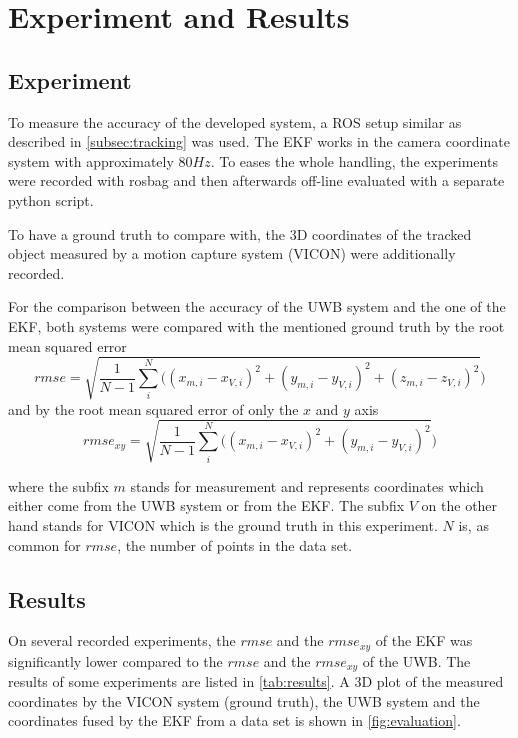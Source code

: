 

\chapter{Experiment and Results}

\section{Experiment}
To measure the accuracy of the developed system, a \ac{ROS} setup similar as described in \autoref{subsec:tracking} was used. The \acf{EKF} works in the camera coordinate system with approximately $80\mathit{Hz}$. To eases the whole handling, the experiments were recorded with rosbag and then afterwards off-line evaluated with a separate python script.

To have a ground truth to compare with, the 3D coordinates of the tracked object measured by a motion capture system (VICON) were additionally recorded.

For the comparison between the accuracy of the \ac{UWB} system and the one of the \ac{EKF}, both systems were compared with the mentioned ground truth by the root mean squared error $$\textit{rmse} = \sqrt{\frac{1}{N - 1} \sum_i^N \big( (x_{m,i} - x_{V,i})^2 + (y_{m,i} - y_{V,i})^2 + (z_{m,i} - z_{V,i})^2}\big)$$
and by the root mean squared error of only the $x$ and $y$ axis
$$\textit{rmse}_{xy} = \sqrt{\frac{1}{N - 1} \sum_i^N \big( (x_{m,i} - x_{V,i})^2 + (y_{m,i} - y_{V,i})^2}\big)$$

where the subfix $m$ stands for measurement and represents coordinates which either come from the \ac{UWB} system or from the \ac{EKF}. The subfix $V$ on the other hand stands for VICON which is the ground truth in this experiment. $N$ is, as common for $\textit{rmse}$, the number of points in the data set.

\section{Results}
On several recorded experiments, the $\textit{rmse}$ and the $\textit{rmse}_{xy}$ of the \ac{EKF} was significantly lower compared to the $\textit{rmse}$ and the $\textit{rmse}_{xy}$ of the \ac{UWB}. The results of some experiments are listed in \autoref{tab:results}. A 3D plot of the measured coordinates by the VICON system (ground truth), the \ac{UWB} system and the coordinates fused by the \ac{EKF} from a data set is shown in \autoref{fig:evaluation}.

